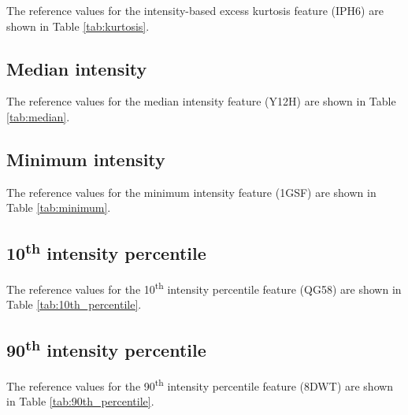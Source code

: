 \documentclass[fleqn,a4paper,oneside,openany]{book}
\newcommand\textid[1]{{\normalsize{\idfont #1}}}
\begin{document}
The reference values for the intensity-based excess kurtosis feature (\textid{IPH6}) are shown in Table \ref{tab:kurtosis}.

\begin{minipage}[l]{0.45\textwidth}

\end{minipage}
\quad
\begin{minipage}[r]{0.45\textwidth}

\end{minipage}
\FloatBarrier

\subsection{Median intensity}

The reference values for the median intensity feature (\textid{Y12H}) are shown in Table \ref{tab:median}.

\subsection{Minimum intensity}
The reference values for the minimum intensity feature (\textid{1GSF}) are shown in Table \ref{tab:minimum}.

\begin{minipage}[l]{0.45\textwidth}

\end{minipage}
\quad
\begin{minipage}[r]{0.45\textwidth}

\end{minipage}
\FloatBarrier

\subsection{10\textsuperscript{th} intensity percentile}
The reference values for the 10\textsuperscript{th} intensity percentile feature (\textid{QG58}) are shown in Table \ref{tab:10th_percentile}.

\subsection{90\textsuperscript{th} intensity percentile}
The reference values for the 90\textsuperscript{th} intensity percentile feature (\textid{8DWT}) are shown in Table \ref{tab:90th_percentile}.

\begin{minipage}[l]{0.45\textwidth}

\end{minipage}
\quad
\begin{minipage}[r]{0.45\textwidth}

\end{minipage}
\FloatBarrier
\end{document}

